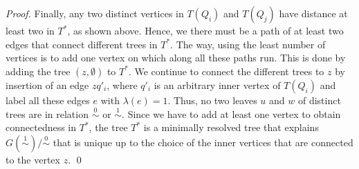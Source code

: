\documentclass[smallextended]{svjour3}
\newcommand{\remove}[1]{\begingroup\tiny\color{yellow}#1\endgroup}
\newcommand{\Ro}{\mathrel{\overset{0}{\sim}}}
\newcommand{\Rl}{\mathrel{\overset{1}{\sim}}}
\begin{document}
\begin{proof}
{   Finally, any two distinct vertices in $T(Q_i)$ and $T(Q_j)$ have distance
	at least two in $T^*$, as shown above. Hence, we there must be a path of at least two edges
   that connect different trees in $T^*$.  The way,
   using the least number of vertices is to add one vertex on which along
   all these paths run. This is done by adding the tree $({z},\emptyset)$ to
   $T^*$.  We continue to connect the different trees to $z$ by insertion of
   an edge $zq'_i$, where $q'_i$ is an arbitrary inner vertex of $T(Q_i)$
   and label all these edges $e$ with $\lambda(e)=1$.  Thus, no two leaves
   $u$ and $w$ of distinct trees are in relation $\Ro$ or $\Rl$.  Since we
   have to add at least one vertex to obtain connectedness in $T^*$, 
	the tree $T^*$ is a minimally resolved tree that explains  $G(\Rl)/\Ro$
	that is unique up to the choice of the inner vertices that are connected to the vertex
   $z$.  \qed }
%        
%

\end{proof}
\end{document}
